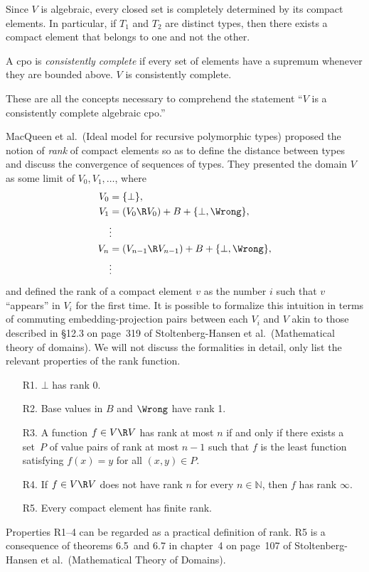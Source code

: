 \documentclass{amsart}
\theoremstyle{definition}
\begin{document}
Since $V$ is algebraic, every closed set is completely determined
by its compact elements. In particular, if $T_1$ and $T_2$ are
distinct types, then there exists a compact element that belongs
to one and not the other.

A cpo is \emph{consistently complete} if every set of elements
have a supremum whenever they are bounded above. $V$ is
consistently complete.

These are all the concepts necessary to comprehend the statement
``$V$ is a consistently complete algebraic cpo.''



MacQueen et al.\ (Ideal model for recursive polymorphic types)
proposed the notion of \emph{rank} of compact elements so as to
define the distance between types and discuss the convergence of
sequences of types. They presented the domain $V$ as some limit
of $V_0,V_1,\ldots$, where
\begin{align*}
V_0 &= \{\bot\},\\
V_1 &= (V_0\R V_0)+B+\{\bot,\Wrong\},\\
&\vdots\\
V_n &= (V_{n-1} \R V_{n-1}) + B + \{\bot,\Wrong\},\\
&\vdots
\end{align*}
and defined the rank of a compact element $v$ as the number $i$
such that $v$ ``appears'' in $V_i$ for the first time. It is
possible to formalize this intuition in terms of commuting
embedding-projection pairs between each $V_i$ and $V$ akin to
those described in \S12.3 on page~319 of Stoltenberg-Hansen et
al.\ (Mathematical theory of domains). We will not discuss the
formalities in detail, only list the relevant properties of the
rank function.
\begin{itemize}\itemsep=1ex
\item[R1.] $\bot$ has rank 0.

\item[R2.] Base values in $B$ and $\Wrong$ have rank 1.

\item[R3.] A function $f\in V\R V$ has rank at most $n$ if and
only if there exists a set~$P$ of value pairs of rank at most
$n-1$ such that $f$ is the least function satisfying $f(x)=y$ for
all $(x,y)\in P$.

\item[R4.] If $f\in V \R V$ does not have rank $n$ for every
$n\in\mathbb N$, then $f$ has rank $\infty$.

\item[R5.] Every compact element has finite rank.
\end{itemize}
Properties R1--4 can be regarded as a practical definition of
rank. R5 is a consequence of theorems 6.5~and 6.7 in chapter~4 on
page~107 of Stoltenberg-Hansen et al.\ (Mathematical Theory of
Domains).
\end{document}
